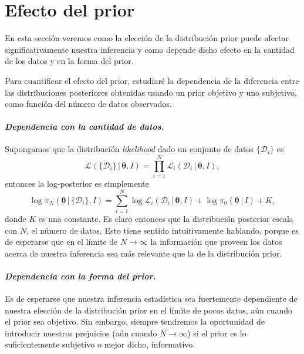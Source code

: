 \documentclass[a4paper,twoside]{article}
\newcommand{\br}{\ensuremath{\,|\,}\xspace}
\newcommand{\hip}{\ensuremath{\mathbold{\theta}}\xspace}
\newcommand{\dat}{\ensuremath{\{\mathcal{D}_i\}}\xspace}
\newcommand{\pos}[2]{\ensuremath{\pi_N\left(#1\br #2\right)}\xspace}
\newcommand{\pri}[2]{\ensuremath{\pi_0\left(#1\br #2\right)}\xspace}
\newcommand{\lik}[3][]{\ensuremath{\mathcal{L}_{#1}\left(#2\br #3\right)}\xspace}
\begin{document}

\section{Efecto del prior}
%
En esta sección veremos como la elección de la distribución prior puede afectar significativamente
nuestra inferencia y como depende dicho efecto en la cantidad de los datos y en la forma del prior.

Para cuantificar el efecto del prior, estudiaré la dependencia de la diferencia entre las
distribuciones posteriores obtenidas usando un prior objetivo y uno subjetivo, como función del
número de datos observados.

\paragraph{\textit{\color{teal}Dependencia con la cantidad de datos.}} Supongamos que la
distribución \emph{likelihood} dado un conjunto de datos \(\dat\) es
%
\[\lik{\dat}{\hip,I} = \prod_{i=1}^N\lik[i]{\mathcal{D}_i}{\hip,I},\]
%
entonces la log-posterior es simplemente
%
\[\log{\pos{\hip}{\dat,I}} = \sum_{i=1}^N\log{\lik[i]{\mathcal{D}_i}{\hip,I}} + \log{\pri{\hip}{I}} + K,\]
%
donde \(K\) es una constante. Es claro entonces que la distribución posterior escala con \(N\), el
número de datos. Esto tiene sentido intuitivamente hablando, porque es de esperarse que en el límite
de \(N\to\infty\) la información que proveen los datos acerca de nuestra inferencia sea más
relevante que la de la distribución prior.

\paragraph{\textit{\color{teal}Dependencia con la forma del prior.}} Es de esperarse que nuestra
inferencia estadística sea fuertemente dependiente de nuestra elección de la distribución prior en
el límite de pocos datos, aún cuando el prior sea objetivo. Sin embargo, siempre tendremos la
oportunidad de introducir nuestros prejuicios (aún cuando \(N\to\infty\)) si el prior es lo
suficientemente subjetivo o mejor dicho, informativo.
\end{document}
